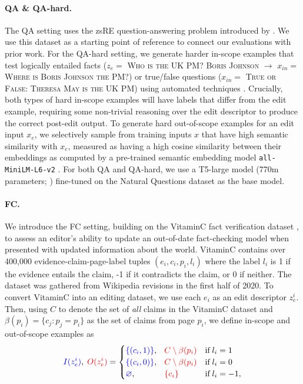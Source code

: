 \documentclass{article}
\newcommand{\rawstring}[1]{\textsc{\footnotesize #1}}
\newcommand{\ze}[1][]{z_e^{#1}}
\newcommand{\xe}{x_e}
\newcommand{\xtest}[1][]{x_{in}^{#1}}
\begin{document}
\paragraph{QA \& QA-hard.} The QA setting uses the zsRE question-answering problem introduced by \citet{Cao2021EditingFK}. We use this dataset as a starting point of reference to connect our evaluations with prior work. For the QA-hard setting, we generate harder in-scope examples that test logically entailed facts (\rawstring{$\ze =$ Who is the UK PM? Boris Johnson $\rightarrow$ $\xtest =$ Where is Boris Johnson the PM?}) or true/false questions (\rawstring{$\xtest =$ True or False: Theresa May is the UK PM}) using automated techniques \citep{demszky2018transforming,ribeiro2019red}. Crucially, both types of hard in-scope examples will have labels that differ from the edit example, requiring some non-trivial reasoning over the edit descriptor to produce the correct post-edit output. To generate hard out-of-scope examples for an edit input $\xe$, we selectively sample from training inputs $x$ that have high semantic similarity with $\xe$, measured as having a high cosine similarity between their embeddings as computed by a pre-trained semantic embedding model \texttt{all-MiniLM-L6-v2} \citep{reimers-2019-sentence-bert}. For both QA and QA-hard, we use a T5-large model (770m parameters; \citet{2020t5}) fine-tuned on the Natural Questions dataset \citep{kwiatkowski2019natural,roberts2020knowledge} as the base model.

\paragraph{FC.} We introduce the FC setting, building on the VitaminC fact verification dataset \citep{schuster-etal-2021-get}, to assess an editor's ability to update an out-of-date fact-checking model when presented with updated information about the world. VitaminC contains over 400,000 evidence-claim-page-label tuples $(e_i, c_i, p_i, l_i)$ where the label $l_i$ is 1 if the evidence entails the claim, -1 if it contradicts the claim, or 0 if neither. The dataset was gathered from Wikipedia revisions in the first half of 2020. To convert VitaminC into an editing dataset, we use each $e_i$ as an edit descriptor $\ze[i]$. Then, using $C$ to denote the set of \textit{all} claims in the VitaminC dataset and $\beta(p_i)=\{c_j : p_j = p_i\}$ as the set of claims from page $p_i$, we define in-scope and out-of-scope examples as
\begin{equation*}
    \textcolor{blue}{I(\ze[i])},\;\textcolor{red}{O(\ze[i])} = \begin{cases}
        \textcolor{blue}{\{(c_i, 1)\}},\phantom{\varnothing} \textcolor{red}{C \setminus \beta(p_i)} & \text{if}\;l_i = 1 \\
        \textcolor{blue}{\{(c_i, 0)\}},\phantom{\varnothing} \textcolor{red}{C \setminus \beta(p_i)} & \text{if}\;l_i = 0 \\
        \textcolor{blue}{\varnothing},\phantom{\{(c_i, 0)\}} \textcolor{red}{\{c_i\}} & \text{if}\;l_i = -1,
    \end{cases}
\end{equation*}
\end{document}
